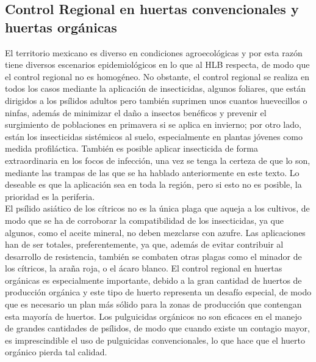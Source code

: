 \subsection{Control Regional en huertas convencionales y huertas orgánicas}%
El territorio mexicano es diverso en condiciones agroecológicas y por esta razón tiene diversos escenarios epidemiológicos en lo que al HLB respecta, de modo que el control regional no es homogéneo. No obstante, el control regional se realiza en todos los casos mediante la aplicación de insecticidas, algunos foliares, que están dirigidos a los psílidos adultos pero también suprimen unos cuantos huevecillos o ninfas, además de minimizar el daño a insectos benéficos y prevenir el surgimiento de poblaciones en primavera si se aplica en invierno; por otro lado, están los insecticidas sistémicos al suelo, especialmente en plantas jóvenes como medida profiláctica. También es posible aplicar insecticida de forma extraordinaria en los focos de infección, una vez se tenga la certeza de que lo son, mediante las trampas de las que se ha hablado anteriormente en este texto. Lo deseable es que la aplicación sea en toda la región, pero si esto no es posible, la prioridad es la periferia.\\
El psílido asiático de los cítricos no es la única plaga que aqueja a los cultivos, de modo que se ha de corroborar la compatibilidad de los insecticidas, ya que algunos, como el aceite mineral, no deben mezclarse con azufre. Las aplicaciones han de ser totales, preferentemente, ya que, además de evitar contribuir al desarrollo de resistencia, también se combaten otras plagas como  el minador de los cítricos, la araña roja, o el ácaro blanco. El control regional en huertas orgánicas es especialmente importante, debido a la gran cantidad de huertos de producción orgánica y  este tipo de huerto representa un desafío especial, de modo que es necesario un plan más sólido para la zonas de producción que contengan esta mayoría de huertos. Los pulguicidas orgánicos no son eficaces en el manejo de grandes cantidades de psílidos, de modo que cuando existe un contagio mayor, es imprescindible el uso de pulguicidas convencionales, lo que hace que el huerto orgánico pierda tal calidad.

